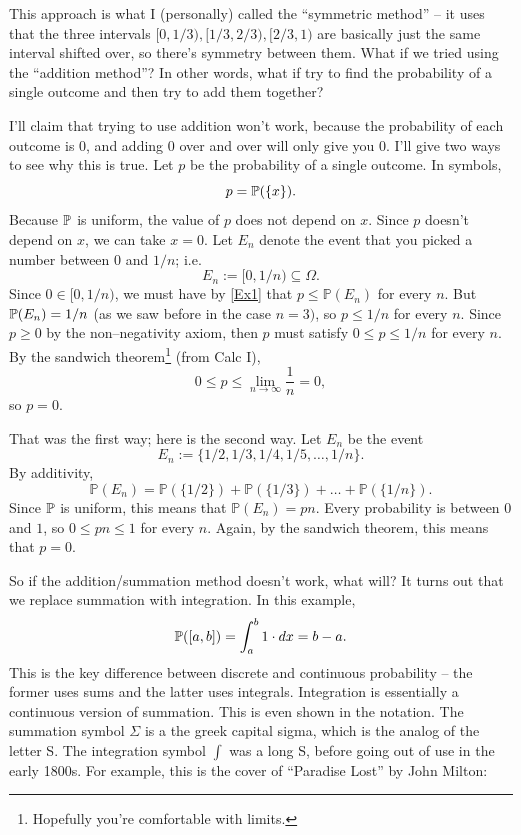 \documentclass{ximera}
\begin{document}
This approach is what I (personally) called the ``symmetric method'' -- it uses that the three intervals $[0,1/3),[1/3,2/3),[2/3,1)$ are basically just the same interval shifted over, so there's symmetry between them. What if we tried using the ``addition method''? In other words, what if try to find the probability of a single outcome and then try to add them together?

I'll claim that trying to use addition won't work, because the probability of each outcome is $0$, and adding $0$ over and over will only give you $0$. I'll give two ways to see why this is true. Let $p$ be the probability of a single outcome. In symbols,
$$
p = \mathbb{P}(\{x\}).
$$
Because $\mathbb{P}$ is uniform, the value of $p$ does not depend on $x$. Since $p$ doesn't depend on $x$, we can take $x=0$. Let $E_n$ denote the event that you picked a number between $0$ and $1/n$; i.e. 
$$
E_n:=[0,1/n)\subseteq \Omega.
$$
Since $0 \in [0,1/n)$, we must have by \eqref{Ex1} that $p\leq \mathbb{P}(E_n)$ for every $n$. But $\mathbb{P}(E_n)=1/n$ (as we saw before in the case $n=3)$, so $p\leq 1/n$ for every $n$. Since $p\geq 0$  by the non--negativity axiom, then $p$ must satisfy $0\leq p \leq 1/n$ for every $n$. By the sandwich theorem\footnote{Hopefully you're comfortable with limits.} (from Calc I),
$$
0 \leq p \leq \lim_{n\rightarrow \infty} \frac{1}{n} = 0,
$$
so $p=0$.

That was the first way; here is the second way. Let $E_n$ be the event
$$
E_n:= \{1/2,1/3,1/4,1/5,\ldots,1/n\}.
$$
By additivity,
$$
\mathbb{P}(E_n) = \mathbb{P}(\{1/2\}) + \mathbb{P}(\{1/3\}) + \ldots + \mathbb{P}(\{1/n\}).
$$
Since $\mathbb{P}$ is uniform, this means that $\mathbb{P}(E_n) = pn$. Every probability is between $0$ and $1$, so $0\leq pn \leq 1$ for every $n$. Again, by the sandwich theorem, this means that $p=0$.

So if the addition/summation method doesn't work, what will? It turns out that we replace summation with integration. In this example,
$$
\mathbb{P}([a,b]) = \int_a^b 1 \cdot dx = b-a.
$$
This is the key difference between discrete and continuous probability -- the former uses sums and the latter uses integrals. Integration is essentially a continuous version of summation. This is even shown in the notation. The summation symbol $\Sigma$ is a the greek capital sigma, which is the analog of the letter S. The integration symbol $\int$ was a long S, before going out of use in the early 1800s. For example, this is the cover of ``Paradise Lost'' by John Milton:

\end{document}
